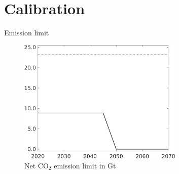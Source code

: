\documentclass[11pt,aspectratio=169]{beamer}
\begin{document}
\section{Calibration}
\begin{frame}{Emission limit}
	\begin{center}
		\hspace{-20mm}
		\begin{minipage}{0.8\textwidth}
			\begin{figure}
				\caption{Net CO$_2$ emission limit in Gt}
				\includegraphics[width=0.7\textwidth]{../codding_model/own_basedOnFried/optimalPol_010922_revision/figures/all_13Sept22_Tplus30/Emnet_goals_o0_lgd0.png}
			\end{figure}
		\end{minipage}
		\hspace{-20mm}

\end{center}
\end{frame}
\end{document}
